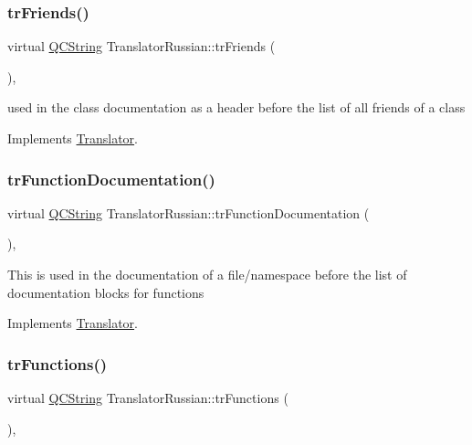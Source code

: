 \subsubsection{\texorpdfstring{trFriends()}{trFriends()}}
{\footnotesize\ttfamily virtual \mbox{\hyperlink{class_q_c_string}{Q\+C\+String}} Translator\+Russian\+::tr\+Friends (\begin{DoxyParamCaption}{ }\end{DoxyParamCaption})\hspace{0.3cm}{\ttfamily [inline]}, {\ttfamily [virtual]}}

used in the class documentation as a header before the list of all friends of a class 

Implements \mbox{\hyperlink{class_translator}{Translator}}.

\mbox{\label{class_translator_russian_aff592cff158bfb4ca4b23bbc0ccc6da3}} 
\subsubsection{\texorpdfstring{trFunctionDocumentation()}{trFunctionDocumentation()}}
{\footnotesize\ttfamily virtual \mbox{\hyperlink{class_q_c_string}{Q\+C\+String}} Translator\+Russian\+::tr\+Function\+Documentation (\begin{DoxyParamCaption}{ }\end{DoxyParamCaption})\hspace{0.3cm}{\ttfamily [inline]}, {\ttfamily [virtual]}}

This is used in the documentation of a file/namespace before the list of documentation blocks for functions 

Implements \mbox{\hyperlink{class_translator}{Translator}}.

\mbox{\label{class_translator_russian_a48947288b1bbef952af6e993faf35edd}} 
\subsubsection{\texorpdfstring{trFunctions()}{trFunctions()}}
{\footnotesize\ttfamily virtual \mbox{\hyperlink{class_q_c_string}{Q\+C\+String}} Translator\+Russian\+::tr\+Functions (\begin{DoxyParamCaption}{ }\end{DoxyParamCaption})\hspace{0.3cm}{\ttfamily [inline]}, {\ttfamily [virtual]}}

